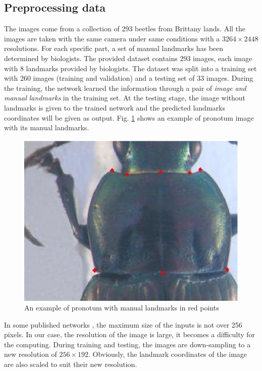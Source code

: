 \documentclass[conference]{IEEEtran}
\begin{document}
\subsection{Preprocessing data}
The images come from a collection of 293 beetles from Brittany lands. All the images are taken with the same camera under same conditions with a $3264 \times 2448$ resolutions. For each specific part, a set of manual landmarks has been determined by biologists. The provided dataset contains 293 images, each image with 8 landmarks provided by biologists. The dataset was split into a training set with 260 images (training and validation) and a testing set of 33 images. During the training, the network learned the information through a pair of \textit{image and manual landmarks} in the training set. At the testing stage, the image without landmarks is given to the trained network and the predicted landmarks coordinates will be given as output. Fig. \ref{figpronotum} shows an example of pronotum image with its manual landmarks.

\begin{figure}[htbp]
	\centerline{\includegraphics[scale=0.9]{images/pronotum.eps}}
	\caption{An example of pronotum with manual landmarks in red points}
	\label{figpronotum}
\end{figure}

In some published networks \cite{krizhevsky2012imagenet}\cite{sun2013deep}\cite{cintas2016automatic}, the maximum size of the inputs is not over 256 pixels. In our case, the resolution of the image is large, it becomes a difficulty for the computing. During training and testing, the images are down-sampling to a new resolution of $256 \times 192$. Obviously, the landmark coordinates of the image are also scaled to suit their new resolution. 
\end{document}
